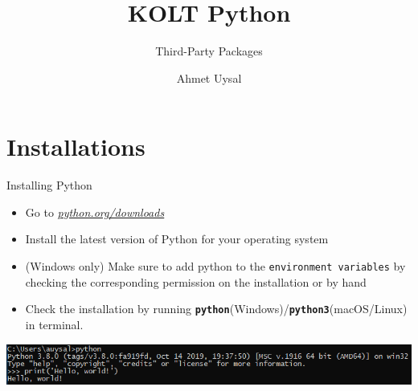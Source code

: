
\usepackage{../KU-Beamer-Template/style/koc} 
\usepackage{minted}
\usepackage{upquote}
\usepackage{graphicx}

\title{KOLT Python}
\subtitle{Third-Party Packages} 
\date{}
\author{Ahmet Uysal}




    \maketitle



    \section{Installations}
    \begin{frame}{Installing Python}
        \LARGE
        \begin{itemize}
            \item Go to \href{https://www.python.org/downloads/}{\underline{\textit{python.org/downloads}}}
            \pause
            \item Install the latest version of Python for your operating system
            \pause
            \item (Windows only) Make sure to add python to the \texttt{environment variables} by checking the corresponding permission on the installation or by hand
            \pause
            \item Check the installation by running \textbf{\texttt{python}}(Windows)/\textbf{\texttt{python3}}(macOS/Linux) in terminal.
        \end{itemize}
        \includegraphics[width=\textwidth]{images/cmd_helloworld.PNG}
    \end{frame}
     
